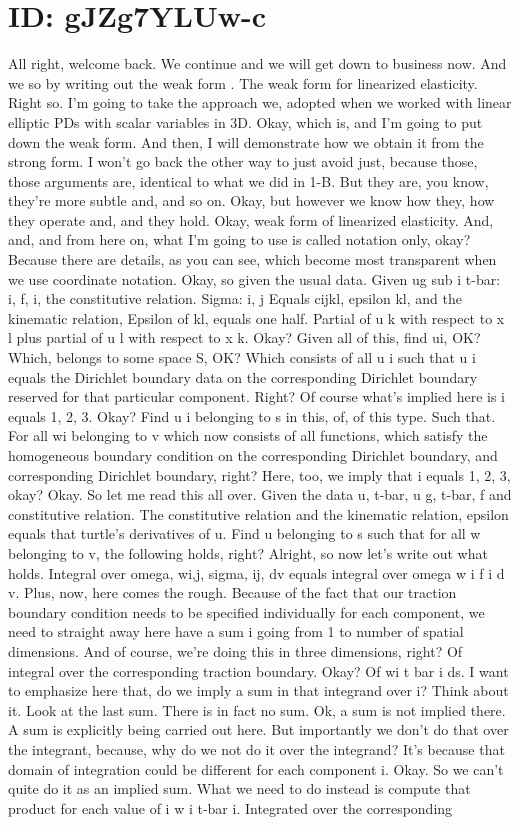 \documentclass[10pt]{article}
\begin{document}
\section*{ID: gJZg7YLUw-c}
All right, welcome back. We continue and we will get down to business now. And we so by writing out the weak form . The weak form for linearized elasticity. Right so. I'm going to take the approach we, adopted when we worked with linear elliptic PDs with scalar variables in 3D. Okay, which is, and I'm going to put down the weak form. And then, I will demonstrate how we obtain it from the strong form. I won't go back the other way to just avoid just, because those, those arguments are, identical to what we did in 1-B. But they are, you know, they're more subtle and, and so on. Okay, but however we know how they, how they operate and, and they hold. Okay, weak form of linearized elasticity. And, and, and from here on, what I'm going to use is called notation only, okay? Because there are details, as you can see, which become most transparent when we use coordinate notation. Okay, so given the usual data. Given ug sub i t-bar: i, f, i, the constitutive relation. Sigma: i, j Equals cijkl, epsilon kl, and the kinematic relation, Epsilon of kl, equals one half. Partial of u k with respect to x l plus partial of u l with respect to x k. Okay? Given all of this, find ui, OK? Which, belongs to some space S, OK? Which consists of all u i such that u i equals the Dirichlet boundary data on the corresponding Dirichlet boundary reserved for that particular component. Right? Of course what's implied here is i equals 1, 2, 3. Okay? Find u i belonging to s in this, of, of this type. Such that. For all wi belonging to v which now consists of all functions, which satisfy the homogeneous boundary condition on the corresponding Dirichlet boundary, and corresponding Dirichlet boundary, right? Here, too, we imply that i equals 1, 2, 3, okay? Okay. So let me read this all over. Given the data u, t-bar, u g, t-bar, f and constitutive relation. The constitutive relation and the kinematic relation, epsilon equals that turtle's derivatives of u. Find u belonging to s such that for all w belonging to v, the following holds, right? Alright, so now let's write out what holds. Integral over omega, wi,j, sigma, ij, dv equals integral over omega w i f i d v. Plus, now, here comes the rough. Because of the fact that our traction boundary condition needs to be specified individually for each component, we need to straight away here have a sum i going from 1 to number of spatial dimensions. And of course, we're doing this in three dimensions, right? Of integral over the corresponding traction boundary. Okay? Of wi t bar i ds. I want to emphasize here that, do we imply a sum in that integrand over i? Think about it. Look at the last sum. There is in fact no sum. Ok, a sum is not implied there. A sum is explicitly being carried out here. But importantly we don't do that over the integrant, because, why do we not do it over the integrand? It's because that domain of integration could be different for each component i. Okay. So we can't quite do it as an implied sum. What we need to do instead is compute that product for each value of i w i t-bar i. Integrated over the corresponding 
\end{document}
